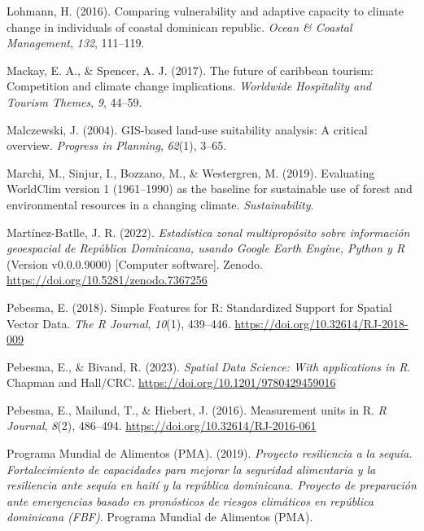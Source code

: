 \documentclass[spanish]{article}
\newlength{\cslhangindent}
\newlength{\cslentryspacingunit} %
\newenvironment{CSLReferences}[2] %
 {%
  \setlength{\parindent}{0pt}
  \ifodd #1
  \let\oldpar\par
  \def\par{\hangindent=\cslhangindent\oldpar}
  \fi
  \setlength{\parskip}{#2\cslentryspacingunit}
 }%
 {}
\begin{document}
\begin{CSLReferences}{1}{0}
\leavevmode{}%
Lohmann, H. (2016). Comparing vulnerability and adaptive capacity to
climate change in individuals of coastal dominican republic. \emph{Ocean
\& Coastal Management}, \emph{132}, 111--119.

\leavevmode{}%
Mackay, E. A., \& Spencer, A. J. (2017). The future of caribbean
tourism: Competition and climate change implications. \emph{Worldwide
Hospitality and Tourism Themes}, \emph{9}, 44--59.

\leavevmode{}%
Malczewski, J. (2004). GIS-based land-use suitability analysis: A
critical overview. \emph{Progress in Planning}, \emph{62}(1), 3--65.

\leavevmode{}%
Marchi, M., Sinjur, I., Bozzano, M., \& Westergren, M. (2019).
Evaluating WorldClim version 1 (1961--1990) as the baseline for
sustainable use of forest and environmental resources in a changing
climate. \emph{Sustainability}.

\leavevmode{}%
Martínez-Batlle, J. R. (2022). \emph{{Estadística zonal multipropósito
sobre información geoespacial de República Dominicana, usando Google
Earth Engine, Python y R}} (Version v0.0.0.9000) {[}Computer
software{]}. Zenodo. \url{https://doi.org/10.5281/zenodo.7367256}

\leavevmode{}%
Pebesma, E. (2018). {Simple Features for R: Standardized Support for
Spatial Vector Data}. \emph{{The R Journal}}, \emph{10}(1), 439--446.
\url{https://doi.org/10.32614/RJ-2018-009}

\leavevmode{}%
Pebesma, E., \& Bivand, R. (2023). \emph{{Spatial Data Science: With
applications in R}}. {Chapman and Hall/CRC}.
\url{https://doi.org/10.1201/9780429459016}

\leavevmode{}%
Pebesma, E., Mailund, T., \& Hiebert, J. (2016). Measurement units in
{R}. \emph{R Journal}, \emph{8}(2), 486--494.
\url{https://doi.org/10.32614/RJ-2016-061}

\leavevmode{}%
Programa Mundial de Alimentos (PMA). (2019). \emph{Proyecto resiliencia
a la sequía. Fortalecimiento de capacidades para mejorar la seguridad
alimentaria y la resiliencia ante sequía en haití y la república
dominicana. Proyecto de preparación ante emergencias basado en
pronósticos de riesgos climáticos en república dominicana (FBF)}.
{Programa Mundial de Alimentos (PMA)}.


\end{CSLReferences}
\end{document}
